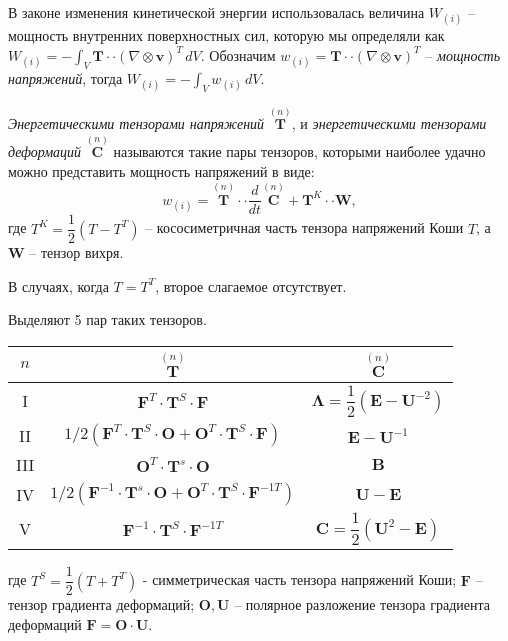 В законе изменения кинетической энергии использовалась величина $W_{(i)}$ -- мощность внутренних
поверхностных сил, которую мы определяли как
$W_{(i)} = - \int_V \mathbf{T} \cdot\cdot (\nabla \otimes \mathbf{v})^T \, dV$.
Обозначим $w_{(i)} = \mathbf{T} \cdot\cdot (\nabla \otimes \mathbf{v})^T$ --
\emph{мощность напряжений}, тогда $W_{(i)} = - \int_V w_{(i)} \, dV$.

\begin{definition}
  \emph{Энергетическими тензорами напряжений} $\stackrel{(n)}{\mathbf{T}}$,
  и \emph{энергетическими тензорами деформаций} $\stackrel{(n)}{\mathbf{C}}$
  называются такие пары тензоров, которыми наиболее удачно можно представить мощность напряжений
  в виде:
  \[
    w_{(i)} = \stackrel{(n)}{\mathbf{T}} \cdot\cdot \dfrac{d}{dt} \stackrel{(n)}{\mathbf{C}} + \mathbf{T}^K \cdot\cdot \mathbf{W},
  \]
  где $T^K = \dfrac{1}{2} (T - T^T)$ -- кососиметричная часть тензора напряжений Коши $T$, а 
  $\mathbf{W}$ -- тензор вихря.

  В случаях, когда $T = T^T$, второе слагаемое отсутствует.
\end{definition}

Выделяют 5 пар таких тензоров.

\begin{center}
  \begin{tabular}{|c|c|c|}
    \hline
    $n$ & $\stackrel{(n)}{\mathbf{T}}$ & $\stackrel{(n)}{\mathbf{C}}$ \\
    \hline
    I & $\mathbf{F}^T \cdot \mathbf{T}^S \cdot \mathbf{F}$ & $\boldsymbol{\Lambda} = \dfrac{1}{2} (\mathbf{E} - \mathbf{U}^{-2})$ \\
    II & $1/2 (\mathbf{F}^T \cdot \mathbf{T}^S \cdot \mathbf{O} + \mathbf{O}^T \cdot \mathbf{T}^S \cdot \mathbf{F})$ & $\mathbf{E} - \mathbf{U}^{-1}$ \\
    III & $\mathbf{O}^T \cdot \mathbf{T}^s \cdot \mathbf{O}$ & $\mathbf{B}$ \\
    IV & $1/2 (\mathbf{F}^{-1} \cdot \mathbf{T}^s \cdot \mathbf{O} + \mathbf{O}^T \cdot \mathbf{T}^S \cdot \mathbf{F}^{-1T})$ & $\mathbf{U} - \mathbf{E}$ \\
    V & $\mathbf{F}^{-1} \cdot \mathbf{T}^S \cdot \mathbf{F}^{-1T}$ & $\mathbf{C} = \dfrac{1}{2}(\mathbf{U}^2 - \mathbf{E})$ \\
    \hline
  \end{tabular}
\end{center}
где $T^S = \dfrac{1}{2} (T + T^T)$ - симметрическая часть тензора напряжений Коши;
$\mathbf{F}$ -- тензор градиента деформаций;
$\mathbf{O}, \mathbf{U}$ -- полярное разложение тензора градиента деформаций $\mathbf{F} = \mathbf{O} \cdot \mathbf{U}$.



